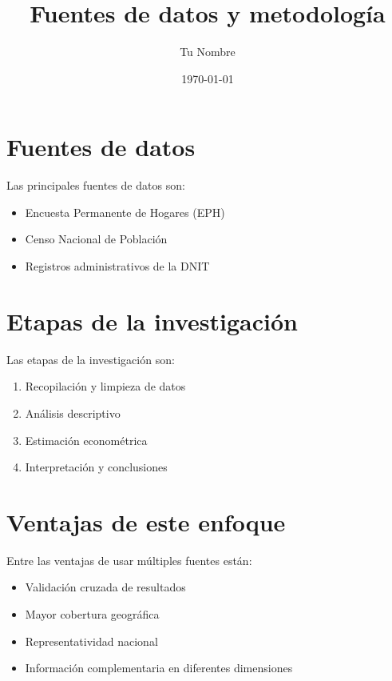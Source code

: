 \documentclass[12pt, a4paper]{article}
\title{Fuentes de datos y metodología}
\author{Tu Nombre}
\date{\today}
\begin{document}
\maketitle

\section{Fuentes de datos}

Las principales fuentes de datos son:
\begin{itemize}
  \item Encuesta Permanente de Hogares (EPH)
  \item Censo Nacional de Población
  \item Registros administrativos de la DNIT
\end{itemize}

\section{Etapas de la investigación}

Las etapas de la investigación son:
\begin{enumerate}
  \item Recopilación y limpieza de datos
  \item Análisis descriptivo
  \item Estimación econométrica
  \item Interpretación y conclusiones
\end{enumerate}

\section{Ventajas de este enfoque}

Entre las ventajas de usar múltiples fuentes están:
\begin{itemize}
  \item Validación cruzada de resultados
  \item Mayor cobertura geográfica
  \item Representatividad nacional
  \item Información complementaria en diferentes dimensiones
\end{itemize}
\end{document}
